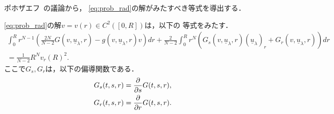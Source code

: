 ポホザエフ\cite{MR0192184}~の議論から，
\eqref{eq:prob_rad}の解がみたすべき等式を導出する．

\begin{lem}
 \eqref{eq:prob_rad}の解$v = v(r) \in C^2([0, R])$は，以下の
 等式をみたす．
 \begin{multline}
  \int_0^R r^{N-1} \left( \frac{2N}{N-2} G(v, \underline{u}_\lambda,
  r) - g(v, \underline{u}_\lambda, r) v \right) dr
  + \frac{2}{N-2} \int_0^R r^N \left( G_s(v, \underline{u}_\lambda, r)
  (\underline{u}_\lambda)_r + G_r(v, \underline{u}_\lambda, r)
  \right) dr \\ = \frac{1}{N-2} R^N v_r(R)^2. \label{eq:poh_eq}
 \end{multline}
 ここで$G_s, G_r$は，以下の偏導関数である．
 \begin{align*}
  G_s(t, s, r) &= \frac{\partial }{\partial s} G(t, s, r), \\
  G_r(t, s, r) &= \frac{\partial }{\partial r} G(t, s, r).
 \end{align*}
\end{lem}

